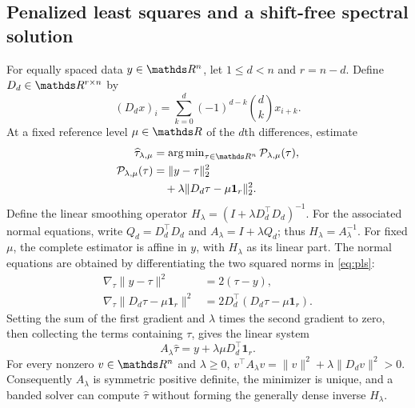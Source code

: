 \subsection{Penalized least squares and a shift-free spectral solution}\label{sec:model}
For equally spaced data $y\in\R^n$, let $1\le d<n$ and $r=n-d$. Define $D_d\in\R^{r\times n}$ by
\begin{equation}\label{eq:difference}
(D_dx)_i=\sum_{k=0}^d(-1)^{d-k}{d\choose k}x_{i+k}.
\end{equation}
At a fixed reference level $\mu\in\R$ of the $d$th differences, estimate
\begin{equation}\label{eq:pls}
\begin{aligned}
\widehat\tau_{\lambda,\mu}
&=\operatorname{arg\,min}_{\tau\in\R^n}
\mathcal P_{\lambda,\mu}(\tau),\\
\mathcal P_{\lambda,\mu}(\tau)
&=\|y-\tau\|_2^2\\
&\quad+\lambda\|D_d\tau-\mu\mathbf1_r\|_2^2.
\end{aligned}
\end{equation}
Define the linear smoothing operator
$H_\lambda=(I+\lambda D_d^\top D_d)^{-1}$.
For the associated normal equations, write
$Q_d=D_d^\top D_d$ and
$A_\lambda=I+\lambda Q_d$;
thus $H_\lambda=A_\lambda^{-1}$.
For fixed $\mu$, the complete estimator is affine
in $y$, with $H_\lambda$ as its linear part.
The normal equations are obtained by differentiating
the two squared norms in \eqref{eq:pls}:
\begin{equation}\label{eq:pls-objective-gradients}
\begin{aligned}
\nabla_\tau\|y-\tau\|^2&=2(\tau-y),\\
\nabla_\tau\|D_d\tau-\mu\mathbf1_r\|^2
&=2D_d^\top(D_d\tau-\mu\mathbf1_r).
\end{aligned}
\end{equation}
Setting the sum of the first gradient and
$\lambda$ times the second gradient to zero,
then collecting the terms containing $\tau$,
gives the linear system
\begin{equation}\label{eq:rhs}
A_\lambda\widehat\tau
=y+\lambda\mu D_d^\top\mathbf1_r.
\end{equation}
For every nonzero $v\in\R^n$ and $\lambda\ge0$,
$v^\top A_\lambda v
=\|v\|^2+\lambda\|D_dv\|^2>0$.
Consequently $A_\lambda$ is symmetric
positive definite, the minimizer is unique,
and a banded solver can compute
$\widehat\tau$ without forming the
generally dense inverse $H_\lambda$.

